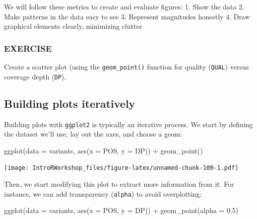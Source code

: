 \documentclass[
]{book}
\newenvironment{Shaded}{\begin{snugshade}}{\end{snugshade}}
\newcommand{\AttributeTok}[1]{\textcolor[rgb]{0.77,0.63,0.00}{#1}}
\newcommand{\FloatTok}[1]{\textcolor[rgb]{0.00,0.00,0.81}{#1}}
\newcommand{\FunctionTok}[1]{\textcolor[rgb]{0.00,0.00,0.00}{#1}}
\newcommand{\NormalTok}[1]{#1}
\newcommand{\SpecialCharTok}[1]{\textcolor[rgb]{0.00,0.00,0.00}{#1}}
\begin{document}
We will follow these metrics to create and evaluate figures:
1. Show the data
2. Make patterns in the data easy to see
3. Represent magnitudes honestly
4. Draw graphical elements clearly, minimizing clutter

\hypertarget{exercise-2}{%
\subsubsection*{EXERCISE}\label{exercise-2}}

Create a scatter plot (using the \texttt{geom\_point()} function for quality (\texttt{QUAL}) versus coverage depth (\texttt{DP}).

\hypertarget{building-plots-iteratively}{%
\subsection*{Building plots iteratively}\label{building-plots-iteratively}}

Building plots with \texttt{ggplot2} is typically an iterative process. We start by defining the dataset we'll use, lay out the axes, and choose a geom:

\begin{Shaded}
\begin{Highlighting}[]
\FunctionTok{ggplot}\NormalTok{(}\AttributeTok{data =}\NormalTok{ variants, }\FunctionTok{aes}\NormalTok{(}\AttributeTok{x =}\NormalTok{ POS, }\AttributeTok{y =}\NormalTok{ DP)) }\SpecialCharTok{+}
  \FunctionTok{geom\_point}\NormalTok{()}
\end{Highlighting}
\end{Shaded}

\texttt{[image: IntroRWorkshop\_files/figure-latex/unnamed-chunk-100-1.pdf]}

Then, we start modifying this plot to extract more information from it. For instance, we can add transparency (\texttt{alpha}) to avoid overplotting:

\begin{Shaded}
\begin{Highlighting}[]
\FunctionTok{ggplot}\NormalTok{(}\AttributeTok{data =}\NormalTok{ variants, }\FunctionTok{aes}\NormalTok{(}\AttributeTok{x =}\NormalTok{ POS, }\AttributeTok{y =}\NormalTok{ DP)) }\SpecialCharTok{+}
    \FunctionTok{geom\_point}\NormalTok{(}\AttributeTok{alpha =} \FloatTok{0.5}\NormalTok{)}
\end{Highlighting}
\end{Shaded}
\end{document}
